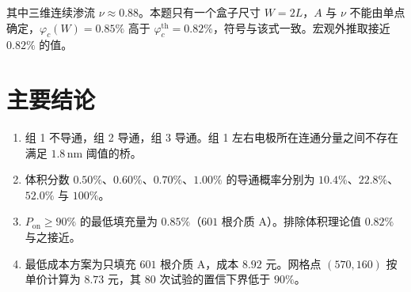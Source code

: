 \documentclass[UTF8,a4paper,zihao=-4,fontset=none]{ctexart}
\begin{document}
其中三维连续渗流 $\nu\approx 0.88$。本题只有一个盒子尺寸 $W=2L$，$A$ 与 $\nu$ 不能由单点确定，$\varphi_c(W)=0.85\%$ 高于 $\varphi_c^{\mathrm{th}}=0.82\%$，符号与该式一致。宏观外推取接近 $0.82\%$ 的值。

\section{主要结论}

\begin{enumerate}
  \item 组 1 不导通，组 2 导通，组 3 导通。组 1 左右电极所在连通分量之间不存在满足 $1.8\,\mathrm{nm}$ 阈值的桥。
  \item 体积分数 $0.50\%$、$0.60\%$、$0.70\%$、$1.00\%$ 的导通概率分别为 $10.4\%$、$22.8\%$、$52.0\%$ 与 $100\%$。
  \item $P_{\mathrm{on}}\ge 90\%$ 的最低填充量为 $0.85\%$（$601$ 根介质 A）。排除体积理论值 $0.82\%$ 与之接近。
  \item 最低成本方案为只填充 $601$ 根介质 A，成本 $8.92$ 元。网格点 $(570,160)$ 按单价计算为 $8.73$ 元，其 $80$ 次试验的置信下界低于 $90\%$。
\end{enumerate}
\end{document}
